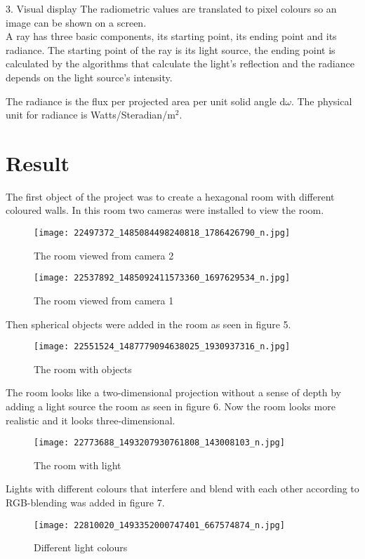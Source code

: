 \documentclass[a4paper,12pt]{IEEEtran}
\begin{document}
3. Visual display
	The radiometric values are translated to pixel colours so an image can be shown on a screen.
\\

A ray has three basic components, its starting point, its ending point and its radiance.
The starting point of the ray is its light source, the ending point is calculated by the algorithms that calculate the light's reflection and the radiance depends on the light source's intensity. 

The radiance is the flux per projected area per unit solid angle d$\omega$. The physical unit for radiance is Watts/Steradian/m$^2$.



\section{Result}

The first object of the project was to create a hexagonal room with different coloured walls. In this room two cameras were installed to view the room. 
\begin{figure}[h!]
\texttt{[image: 22497372\_1485084498240818\_1786426790\_n.jpg]}
\caption{The room viewed from camera 2}
\end{figure}

\begin{figure}[h!]
\texttt{[image: 22537892\_1485092411573360\_1697629534\_n.jpg]}
\caption{The room viewed from camera 1}
\end{figure}
Then spherical objects were added in the room as seen in figure 5. 

\begin{figure}[h!]
\texttt{[image: 22551524\_1487779094638025\_1930937316\_n.jpg]}
\caption{The room with objects}
\end{figure}

The room looks like a two-dimensional projection without a sense of depth by adding a light source the room as seen in figure 6. Now the room looks more realistic and it looks three-dimensional. 

\begin{figure}[h!]
\texttt{[image: 22773688\_1493207930761808\_143008103\_n.jpg]}
\caption{The room with light}
\end{figure}

Lights with different colours that interfere and blend with each other according to RGB-blending was added in figure 7.
\begin{figure}[h!]
\texttt{[image: 22810020\_1493352000747401\_667574874\_n.jpg]}
\caption{Different light colours}
\end{figure}
\end{document}
